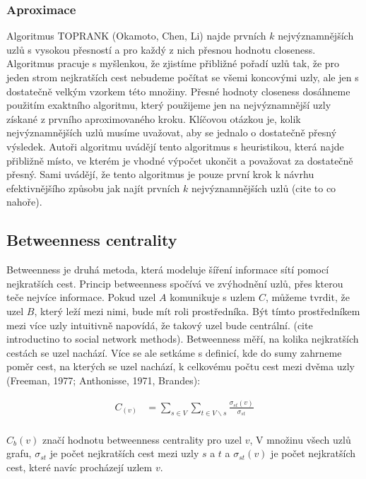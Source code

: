 \documentclass{bakalarka}
\begin{document}
\subsubsection{Aproximace}
Algoritmus TOPRANK (Okamoto, Chen, Li) najde prvních $k$ nejvýznamnějších uzlů
s vysokou přesností a pro každý z nich přesnou hodnotu closeness.  Algoritmus
pracuje s myšlenkou, že zjistíme přibližné pořadí uzlů tak, že pro jeden strom
nejkratších cest nebudeme počítat se všemi koncovými uzly, ale jen s dostatečně
velkým vzorkem této množiny.  Přesné hodnoty closeness dosáhneme použitím
exaktního algoritmu, který použijeme jen na nejvýznamnější uzly získané z
prvního aproximovaného kroku. Klíčovou otázkou je, kolik nejvýznamnějších uzlů
musíme uvažovat, aby se jednalo o dostatečně přesný výsledek. Autoři algoritmu
uvádějí tento algoritmus s heuristikou, která najde přibližně místo, ve kterém
je vhodné výpočet ukončit a považovat za dostatečně přesný. Sami uvádějí, že
tento algoritmus je pouze první krok k návrhu efektivnějšího způsobu jak najít
prvních $k$ nejvýznamnějších uzlů (cite to co nahoře).

\subsection{Betweenness centrality}
Betweenness je druhá metoda, která modeluje šíření informace sítí pomocí
nejkratších cest. Princip betweenness spočívá ve zvýhodnění uzlů, přes kterou
teče nejvíce informace. Pokud uzel $A$ komunikuje s uzlem $C$, můžeme tvrdit,
že uzel $B$, který leží mezi nimi, bude mít roli prostředníka. Být tímto
prostředníkem mezi více uzly intuitivně napovídá, že takový uzel bude
centrální.  (cite introductino to social network methods). Betweenness
měří, na kolika nejkratších cestách se uzel nachází. Více se ale setkáme s
definicí, kde do sumy zahrneme poměr cest, na kterých se uzel nachází, k
celkovému počtu cest mezi dvěma uzly (Freeman, 1977; Anthonisse, 1971,
Brandes):

\begin{align*}
C_(v) &= \displaystyle\sum\limits_{s \in V} \displaystyle\sum\limits_{t \in V \backslash s} \frac{\sigma_{st}(v)}{\sigma_{st}} \\
\end{align*}

$C_b(v)$ značí hodnotu betweenness centrality pro uzel $v$, V množinu všech
uzlů grafu, $\sigma_{st}$ je počet nejkratších cest mezi uzly $s$ a $t$ a
$\sigma_{st}(v)$ je počet nejkratších cest, které navíc procházejí uzlem $v$.
\end{document}
